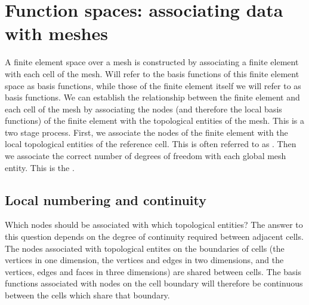 \documentclass{book}
\begin{document}
\chapter{Function spaces: associating data with meshes}
\label{\detokenize{4_function_spaces::doc}}\label{\detokenize{4_function_spaces:function-spaces-associating-data-with-meshes}}
A finite element space over a mesh is constructed by associating a
finite element with each cell of the mesh. Will refer to the basis
functions of this finite element space as  basis functions,
while those of the finite element itself we will refer to as 
basis functions. We can establish the relationship between the finite
element and each cell of the mesh by associating the nodes (and
therefore the local basis functions) of the finite element with the
topological entities of the mesh. This is a two stage process. First,
we associate the nodes of the finite element with the local
topological entities of the reference cell. This is often referred to
as . Then we associate the correct number of degrees
of freedom with each global mesh entity. This is the .


\section{Local numbering and continuity}
\label{\detokenize{4_function_spaces:local-numbering-and-continuity}}
Which nodes should be associated with which topological entities? The
answer to this question depends on the degree of continuity required
between adjacent cells. The nodes associated with topological entites
on the boundaries of cells (the vertices in one dimension, the
vertices and edges in two dimensions, and the vertices, edges and
faces in three dimensions) are shared between cells. The basis
functions associated with nodes on the cell boundary will therefore be
continuous between the cells which share that boundary.
\end{document}
